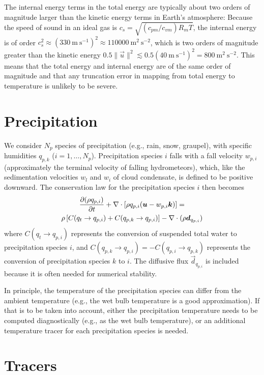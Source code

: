 \documentclass{report}
\begin{document}
The internal energy terms in the total energy are typically about two orders of magnitude larger than the kinetic energy terms in Earth's atmosphere: Because the speed of sound in an ideal gas is $c_s = \sqrt{(c_{pm}/c_{vm}) R_m T}$, the internal energy is of order $c_s^2 \approx (330~\mathrm{m~s^{-1}})^2 \approx 110000~\mathrm{m^2~s^{-2}}$, which is two orders of magnitude greater than the kinetic energy $0.5 \|\vec{u}\|^2 \lesssim 0.5(40~\mathrm{m~s^{-1}})^2 = 800~\mathrm{m^2~s^{-2}}$. This means that the total energy and internal energy are of the same order of magnitude and that any truncation error in mapping from total energy to temperature is unlikely to be severe.

\section{Precipitation}

We  consider $N_p$ species of precipitation (e.g., rain, snow, graupel), with specific humidities $q_{p,k}$ ($i=1,\dots,N_p$). Precipitation species $i$ falls with a fall velocity $w_{p,i}$ (approximately the terminal velocity of falling hydrometeors), which, like the sedimentation velocities $w_l$ and $w_i$ of cloud condensate, is defined to be positive downward. The conservation law for the precipitation species $i$ then becomes
\begin{multline}
\frac{\partial (\rho q_{p,i})}{\partial t} + \nabla \cdot \left[\rho q_{p,i} (\boldsymbol{{u}} - w_{p,i} \boldsymbol{{k}}) \right] =\\
\rho \left[C(q_t \rightarrow q_{p,i}) + C(q_{p,k} \rightarrow q_{p,i}) \right] -\nabla \cdot (\rho \boldsymbol{{d}}_{q_{p, i}})
\label{eq:precip}
\end{multline}
where $C(q_t \rightarrow q_{p,i})$ represents the conversion of suspended total water to precipitation species $i$, and $C(q_{p,k} \rightarrow q_{p,i}) = -C(q_{p,i} \rightarrow q_{p,k})$ represents the conversion of precipitation species $k$ to $i$. The diffusive flux $\vec{d}_{q_{p, i}}$ is included because it is often needed for numerical stability.

In principle, the temperature of the precipitation species can differ from the ambient temperature (e.g., the wet bulb temperature is a good approximation). If that is to be taken into account, either the precipitation temperature needs to be computed diagnostically (e.g., as the wet bulb temperature), or an additional temperature tracer for each precipitation species is needed.

\section{Tracers}
\end{document}
